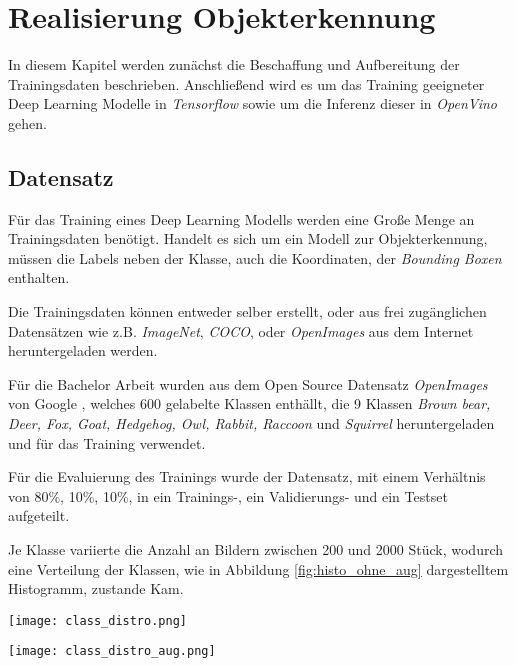 \chapter{Realisierung Objekterkennung}\label{kap:object_det}

In diesem Kapitel werden zunächst die Beschaffung und Aufbereitung 
der Trainingsdaten beschrieben. Anschließend wird es um das 
Training geeigneter Deep Learning Modelle in \textit{Tensorflow}
 sowie um die Inferenz dieser in \textit{OpenVino} gehen.

\section{Datensatz}\label{sec:dataset}

Für das Training eines Deep Learning Modells werden 
eine Große Menge an Trainingsdaten benötigt.
Handelt es sich um ein Modell zur Objekterkennung,
müssen die Labels neben der Klasse, auch die Koordinaten, 
der \textit{Bounding Boxen} enthalten.

Die Trainingsdaten können entweder selber erstellt, oder 
aus frei zugänglichen Datensätzen wie z.B. \textit{ImageNet}, 
\textit{COCO}, oder \textit{OpenImages}
aus dem Internet heruntergeladen werden.

Für die Bachelor Arbeit wurden aus dem Open Source Datensatz
\textit{OpenImages} von Google
\cite{kuznetsovaOpenImagesDataset2018}, 
welches 600 gelabelte Klassen enthällt, 
die 9 Klassen \textit{Brown bear, Deer, Fox, Goat, 
Hedgehog, Owl, Rabbit, Raccoon} und \textit{Squirrel}
heruntergeladen und für das Training verwendet.

Für die Evaluierung des Trainings wurde der 
Datensatz, mit einem Verhältnis von 80\%, 10\%, 10\%, in ein
Trainings-, ein Validierungs- und ein 
Testset aufgeteilt.

Je Klasse variierte die Anzahl an Bildern zwischen 200 und 
2000 Stück, wodurch eine Verteilung der Klassen, 
wie in  Abbildung \ref{fig:histo_ohne_aug} dargestelltem
Histogramm, zustande Kam.

\vspace{1cm}
\begin{minipage}{0.5\textwidth}
    \centering
    \texttt{[image: class\_distro.png]}
    \label{fig:histo_ohne_aug}
\end{minipage}
\begin{minipage}{0.5\textwidth}
    \centering
    \texttt{[image: class\_distro\_aug.png]}
    \label{fig:histo_mit_aug}
\end{minipage}
\vspace{1cm}

